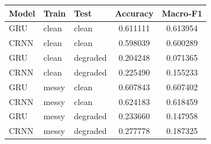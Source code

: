 \begin{tabular}{lllcc}
\hline
Model & Train & Test & Accuracy & Macro-F1 \\
\hline
GRU & clean & clean & 0.611111 & 0.613954 \\
CRNN & clean & clean & 0.598039 & 0.600289 \\
GRU & clean & degraded & 0.204248 & 0.071365 \\
CRNN & clean & degraded & 0.225490 & 0.155233 \\
GRU & messy & clean & 0.607843 & 0.607402 \\
CRNN & messy & clean & 0.624183 & 0.618459 \\
GRU & messy & degraded & 0.233660 & 0.147958 \\
CRNN & messy & degraded & 0.277778 & 0.187325 \\
\hline
\end{tabular}
